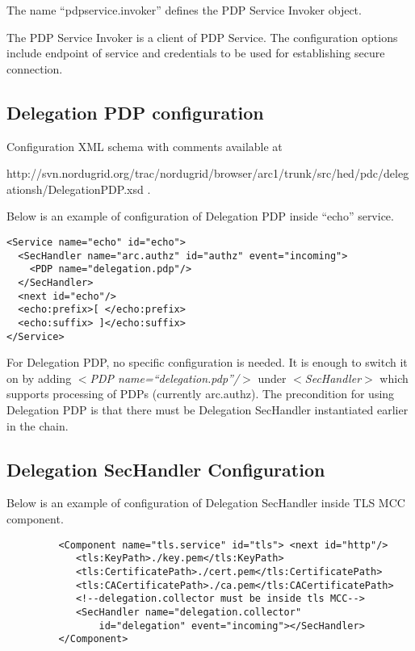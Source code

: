 \documentclass{book}
\begin{document}
The name ``pdpservice.invoker'' defines the PDP Service Invoker object.

The PDP Service Invoker is a client of PDP Service. The configuration options include endpoint of service and credentials to be used for establishing secure connection.


\subsection{Delegation PDP configuration} %
\label{subsec:delegpdp_conf}
Configuration XML schema with comments available at 

http://svn.nordugrid.org/trac/nordugrid/browser/arc1/trunk/src/hed/pdc/delegationsh/DelegationPDP.xsd .

Below is an example of configuration of Delegation PDP inside ``echo'' service.

\begin{verbatim}
<Service name="echo" id="echo">
  <SecHandler name="arc.authz" id="authz" event="incoming">
    <PDP name="delegation.pdp"/>
  </SecHandler>
  <next id="echo"/>
  <echo:prefix>[ </echo:prefix>
  <echo:suffix> ]</echo:suffix>
</Service>
\end{verbatim}

For Delegation PDP, no specific configuration is needed. It is enough to switch it on by adding \textit{$<$PDP name=``delegation.pdp''/$>$} under \textit{$<$SecHandler$>$} which supports processing of PDPs (currently arc.authz).
The precondition for using Delegation PDP is that there must be Delegation SecHandler instantiated earlier in the chain.


\subsection{Delegation SecHandler Configuration} %
\label{subsec:deleg_sechandler_conf}
Below is an example of configuration of Delegation SecHandler inside TLS MCC component.

\begin{verbatim}
         <Component name="tls.service" id="tls"> <next id="http"/>
            <tls:KeyPath>./key.pem</tls:KeyPath>
            <tls:CertificatePath>./cert.pem</tls:CertificatePath>
            <tls:CACertificatePath>./ca.pem</tls:CACertificatePath>
            <!--delegation.collector must be inside tls MCC-->
            <SecHandler name="delegation.collector" 
                id="delegation" event="incoming"></SecHandler>
         </Component>
\end{verbatim}
\end{document}
